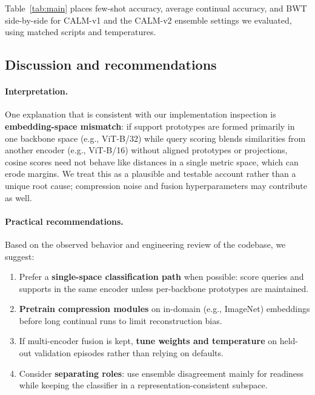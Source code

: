 \documentclass{article}
\begin{document}
Table~\ref{tab:main} places few-shot accuracy, average continual accuracy, and BWT side-by-side for CALM-v1 and the CALM-v2 ensemble settings we evaluated, using matched scripts and temperatures.

\subsection{Discussion and recommendations}\label{sec:discussion}
\paragraph{Interpretation.}
One explanation that is consistent with our implementation inspection is \textbf{embedding-space mismatch}: if support prototypes are formed primarily in one backbone space (e.g., ViT-B/32) while query scoring blends similarities from another encoder (e.g., ViT-B/16) without aligned prototypes or projections, cosine scores need not behave like distances in a single metric space, which can erode margins. We treat this as a plausible and testable account rather than a unique root cause; compression noise and fusion hyperparameters may contribute as well.

\paragraph{Practical recommendations.}
Based on the observed behavior and engineering review of the codebase, we suggest:
\begin{enumerate}
    \item Prefer a \textbf{single-space classification path} when possible: score queries and supports in the same encoder unless per-backbone prototypes are maintained.
    \item \textbf{Pretrain compression modules} on in-domain (e.g., ImageNet) embeddings before long continual runs to limit reconstruction bias.
    \item If multi-encoder fusion is kept, \textbf{tune weights and temperature} on held-out validation episodes rather than relying on defaults.
    \item Consider \textbf{separating roles}: use ensemble disagreement mainly for readiness while keeping the classifier in a representation-consistent subspace.
\end{enumerate}
\end{document}
